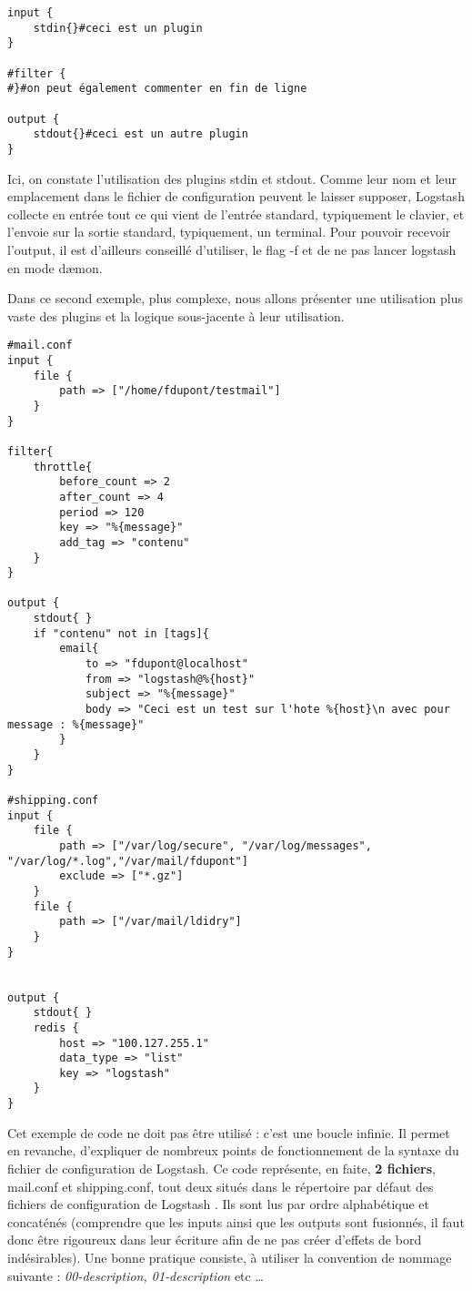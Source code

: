 \begin{lstlisting}[style=logstash,label={lst:conflogstashminimale},caption={Configuration minimale}]
input {
    stdin{}#ceci est un plugin
}

#filter {
#}#on peut également commenter en fin de ligne

output {
    stdout{}#ceci est un autre plugin
}
\end{lstlisting}

Ici, on constate l'utilisation des plugins stdin et stdout. Comme leur nom 
et leur emplacement dans le fichier de configuration peuvent le laisser supposer,
Logstash collecte en entrée tout ce qui vient de l'entrée standard, typiquement
le clavier, et l'envoie sur la sortie standard, typiquement, un terminal.
Pour pouvoir recevoir l'output, il est d'ailleurs conseillé d'utiliser, le flag -f
et de ne pas lancer logstash en mode dæmon.

Dans ce second exemple, plus complexe, nous allons présenter une utilisation plus
vaste des plugins et la logique sous-jacente à leur utilisation.

\begin{lstlisting}[style=logstash,label={lst:conflogstashiniteloop},caption={Infinite loop}]
#mail.conf
input {
    file {
        path => ["/home/fdupont/testmail"]
    }
}

filter{
    throttle{
        before_count => 2
        after_count => 4
        period => 120
        key => "%{message}"
        add_tag => "contenu"
    }
}

output {
    stdout{ }
    if "contenu" not in [tags]{
        email{
            to => "fdupont@localhost"
            from => "logstash@%{host}"
            subject => "%{message}"
            body => "Ceci est un test sur l'hote %{host}\n avec pour message : %{message}"
        }
    }
}

#shipping.conf
input {
    file {
        path => ["/var/log/secure", "/var/log/messages", "/var/log/*.log","/var/mail/fdupont"]
        exclude => ["*.gz"]
    }
    file {
        path => ["/var/mail/ldidry"]
    }
}


output {
    stdout{ }
    redis {
        host => "100.127.255.1"
        data_type => "list"
        key => "logstash"
    }
}
\end{lstlisting}

Cet exemple de code ne doit pas être utilisé : c'est une boucle infinie.
Il permet en revanche, d'expliquer de nombreux points de fonctionnement de la syntaxe
du fichier de configuration de Logstash.
Ce code représente, en faite, {\bfseries 2 fichiers}, mail.conf et shipping.conf, tout
deux situés dans le répertoire par défaut des fichiers de configuration de Logstash
. Ils sont lus par ordre alphabétique et concaténés 
(comprendre que les inputs ainsi que les outputs sont fusionnés, il faut donc être
rigoureux dans leur écriture afin de ne pas créer d'effets de bord indésirables).
Une bonne pratique consiste, à utiliser la convention de nommage suivante : \textit{
00-description, 01-description} etc \ldots


